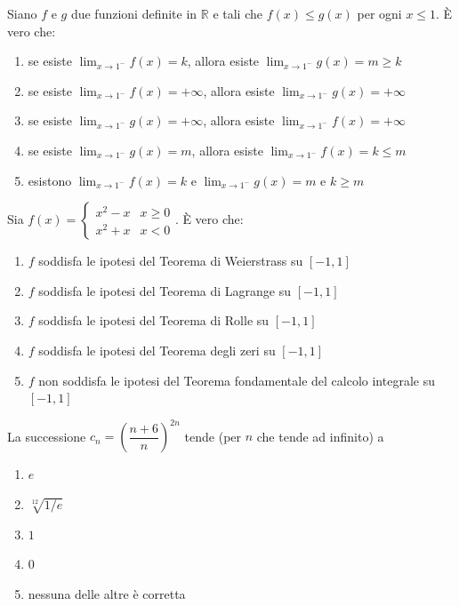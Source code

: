 \begin{quiz}
Siano $f$ e $g$ due funzioni definite in $\mathbb R$ e tali che $f(x)\le g(x)$ per ogni $x\le1$. \`E vero che:
\begin{enumerate}
\item se esiste $\lim_{x\to1^-}f(x)=k$, allora esiste $\lim_{x\to1^-}g(x)=m\ge k$
\item se esiste $\lim_{x\to1^-}f(x)=+\infty$, allora esiste $\lim_{x\to1^-}g(x)=+\infty$
\item se esiste $\lim_{x\to1^-}g(x)=+\infty$, allora esiste $\lim_{x\to1^-}f(x)=+\infty$
\item se esiste $\lim_{x\to1^-}g(x)=m$, allora esiste $\lim_{x\to1^-}f(x)=k\le m$
\item esistono $\lim_{x\to1^-}f(x)=k$ e $\lim_{x\to1^-}g(x)=m$ e $k\ge m$
\end{enumerate}
\end{quiz}

\begin{quiz}
Sia $f(x)=\begin{cases}x^2-x&x\ge0\\x^2+x&x<0\end{cases}$. \`E vero che:
\begin{enumerate}
\item $f$ soddisfa le ipotesi del Teorema di Weierstrass su $[-1,1]$
\item $f$ soddisfa le ipotesi del Teorema di Lagrange su $[-1,1]$
\item $f$ soddisfa le ipotesi del Teorema di Rolle su $[-1,1]$
\item $f$ soddisfa le ipotesi del Teorema degli zeri su $[-1,1]$
\item $f$ non soddisfa le ipotesi del Teorema fondamentale del calcolo integrale su $[-1,1]$
\end{enumerate}
\end{quiz}

\begin{quiz}
La successione $c_n=\left(\dfrac{n+6}{n}\right)^{2n}$ tende (per $n$ che tende ad infinito) a
\begin{enumerate}
\item $e$
\item $\sqrt[12]{1/e}$
\item $1$
\item $0$
\item nessuna delle altre \`e corretta
\end{enumerate}
\end{quiz}

